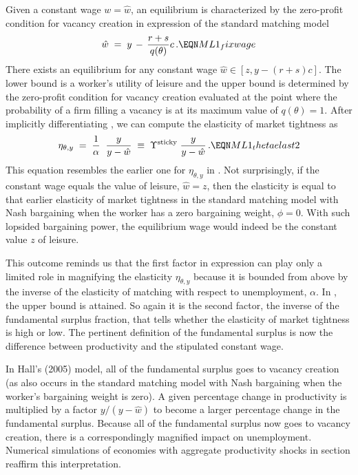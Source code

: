 Given a constant wage $w=\hat w$, an equilibrium is
characterized by the zero-profit condition for vacancy creation
in expression  of the standard matching model
$$
\hat w\;=\; y \,-\, {r+s \over q(\theta)} c \,.      \EQN ML1_fixwage
$$
There exists an equilibrium for any constant wage
$\hat w \in [z, y-(r+s)c]$. The lower bound
is a worker's utility of leisure and the upper bound
is determined by the zero-profit condition for vacancy
creation evaluated at the  point where the  probability of a firm filling a vacancy
is at its maximum value of $q(\theta)=1$.
After implicitly differentiating ,
we can compute the elasticity of market tightness as
$$
\eta_{\theta,y}
\;=\; { 1 \over \alpha } \;\; {y \over y-\hat w}
\;\equiv\; \Upsilon^{\rm sticky}\; {y \over y-\hat w}\,.
                                                \EQN ML1_thetaelast2
$$
This equation resembles the earlier one for $\eta_{\theta,y}$  in
. Not surprisingly, if the constant wage
 equals the value of leisure, $\hat w = z$, then the
elasticity  is equal to that earlier
elasticity of market tightness in the standard
matching model with Nash bargaining when the worker has a zero
bargaining weight, $\phi=0$. With such lopsided
bargaining power, the equilibrium wage would indeed be the constant
value $z$ of leisure.

This outcome reminds us that the first factor in
expression  can play only a limited role in magnifying
the elasticity $\eta_{\theta,y}$ because it is bounded from above by the inverse of
the elasticity of matching with respect to unemployment, $\alpha$.   In
,  the upper bound is attained.
So again it is the second factor, the inverse of the fundamental
surplus fraction, that tells whether the elasticity
of market tightness is high or low. The pertinent definition of
the fundamental surplus is now the difference between productivity and
the stipulated constant wage.

In Hall's (2005) model, all
of the fundamental surplus goes to vacancy creation (as also occurs  in the
standard matching model with Nash
bargaining when  the worker's
bargaining weight is zero). A given percentage
change in productivity is multiplied  by a factor  \hbox{$y/(y-\hat w)$}
to become a larger percentage
change in the fundamental surplus.
Because all of the fundamental surplus now goes to vacancy creation, there
is a correspondingly magnified impact on unemployment. Numerical simulations of economies with aggregate
productivity shocks in section  reaffirm this interpretation.




